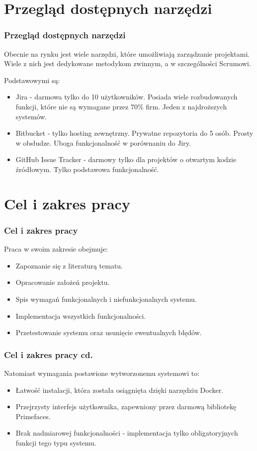 \documentclass[hyperref={pdfpagelabels=false}]{beamer}
\begin{document}
\section{Przegląd dostępnych narzędzi}
\begin{frame}
	\frametitle{Przegląd dostępnych narzędzi}
	Obecnie na rynku jest wiele narzędzi, które umożliwiają zarządzanie projektami. Wiele z nich jest dedykowane metodykom zwinnym, a w szczególności Scrumowi.
	\pause
	
	Podstawowymi są:
	\pause
	\begin{itemize}
		\item Jira - darmowa tylko do 10 użytkowników. Posiada wiele rozbudowanych funkcji, które nie są wymagane przez 70\% firm. Jeden z najdroższych systemów.
		\pause
		\item Bitbucket - tylko hosting zewnętrzny. Prywatne repozytoria do 5 osób. Prosty w obsłudze. Uboga funkcjonalność w porównaniu do Jiry.
		\pause
		\item GitHub Issue Tracker - darmowy tylko dla projektów o otwartym kodzie źródłowym. Tylko podstawowa funkcjonalność.
	\end{itemize}
\end{frame}

\section{Cel i zakres pracy}
\begin{frame}
	\frametitle{Cel i zakres pracy}
		Praca w swoim zakresie obejmuje:
		\pause
		\begin{itemize}			
			\item Zapoznanie się z literaturą tematu.
			\pause
			\item Opracowanie założeń projektu.
			\pause
			\item Spis wymagań funkcjonalnych i niefunkcjonalnych systemu.
			\pause
			\item Implementacja wszystkich funkcjonalności.
			\pause
			\item Przetestowanie systemu oraz usunięcie ewentualnych błędów.
		\end{itemize}
\end{frame}
\begin{frame}
	\frametitle{Cel i zakres pracy cd.}
		Natomiast wymagania postawione wytworzonemu systemowi to:
		\pause
		\begin{itemize}
			\item Łatwość instalacji, która została osiągnięta dzięki narzędziu Docker.
			\pause
			\item Przejrzysty interfejs użytkownika, zapewniony przez darmową bibliotekę Primefaces.
			\pause
			\item Brak nadmiarowej funkcjonalności - implementacja tylko obligatoryjnych funkcji tego typu systemu.
		\end{itemize}
\end{frame}
\end{document}
